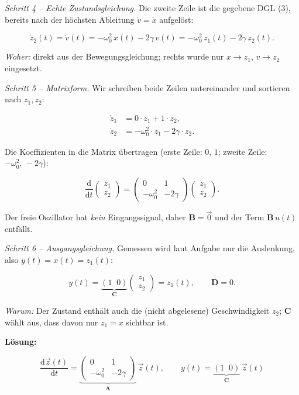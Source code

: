 \begin{beispiel}
\medskip
\textit{Schritt 4 – Echte Zustandsgleichung.}
Die zweite Zeile ist die gegebene DGL (3), bereits nach der höchsten Ableitung
$\dot{v} = \ddot{x}$ aufgelöst:

$$
\dot{z}_2(t) = \dot{v}(t) = -\omega_0^2\, x(t) - 2\gamma\, v(t)
            = -\omega_0^2\, z_1(t) - 2\gamma\, z_2(t).
$$

\emph{Woher:} direkt aus der Bewegungsgleichung; rechts wurde nur
$x \to z_1$, $v \to z_2$ eingesetzt.

\medskip
\textit{Schritt 5 – Matrixform.}
Wir schreiben beide Zeilen untereinander und sortieren nach $z_1, z_2$:

$$
\begin{aligned}
\dot{z}_1 &= 0\cdot z_1 + 1\cdot z_2, \\
\dot{z}_2 &= -\omega_0^2\cdot z_1 - 2\gamma\cdot z_2.
\end{aligned}
$$

Die Koeffizienten in die Matrix übertragen (erste Zeile: $0,\,1$; zweite Zeile:
$-\omega_0^2,\,-2\gamma$):

$$
\frac{\mathrm{d}}{\mathrm{d}t}
\begin{pmatrix} z_1 \\ z_2 \end{pmatrix}
=
\begin{pmatrix} 0 & 1 \\ -\omega_0^2 & -2\gamma \end{pmatrix}
\begin{pmatrix} z_1 \\ z_2 \end{pmatrix}.
$$

Der freie Oszillator hat \emph{kein} Eingangssignal, daher $\mathbf{B} = \vec{0}$
und der Term $\mathbf{B}\,u(t)$ entfällt.

\medskip
\textit{Schritt 6 – Ausgangsgleichung.}
Gemessen wird laut Aufgabe nur die Auslenkung, also $y(t) = x(t) = z_1(t)$:

$$
y(t) = \underbrace{(1\;\; 0)}_{\mathbf{C}}
\begin{pmatrix} z_1 \\ z_2 \end{pmatrix} = z_1(t),
\qquad \mathbf{D} = 0.
$$

\emph{Warum:} Der Zustand enthält auch die (nicht abgelesene) Geschwindigkeit
$z_2$; $\mathbf{C}$ wählt aus, dass davon nur $z_1 = x$ sichtbar ist.

\textbf{Lösung:}

$$
\boxed{
\frac{\mathrm{d}\vec{z}(t)}{\mathrm{d}t}
= \underbrace{\begin{pmatrix} 0 & 1 \\ -\omega_0^2 & -2\gamma \end{pmatrix}}_{\mathbf{A}}
\,\vec{z}(t),
\qquad
y(t) = \underbrace{(1\;\; 0)}_{\mathbf{C}}\,\vec{z}(t)
}
$$


\end{beispiel}
